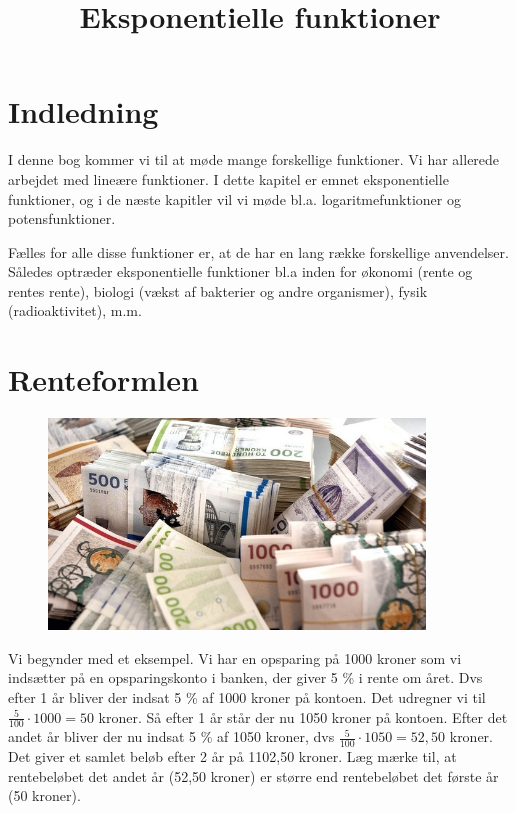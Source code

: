 \documentclass[12pt,oneside,a4paper]{article}
\title{Eksponentielle funktioner}
\begin{document}
\maketitle

\section{Indledning}
I denne bog kommer vi til at møde mange forskellige funktioner. Vi har allerede
arbejdet med lineære funktioner. I dette kapitel er emnet eksponentielle
funktioner, og i de næste kapitler vil vi møde bl.a. logaritmefunktioner og
potensfunktioner.

Fælles for alle disse funktioner er, at de har en lang række forskellige
anvendelser. Således optræder eksponentielle funktioner bl.a inden for økonomi
(rente og rentes rente), biologi (vækst af bakterier og andre organismer),
fysik (radioaktivitet), m.m.

\section{Renteformlen}
\begin{figure}[ht]
    \centering
    \includegraphics[width=10cm]{penge}
\end{figure}

Vi begynder med et eksempel. Vi har en opsparing på 1000 kroner som vi
indsætter på en opsparingskonto i banken, der giver 5 \% i rente om året. Dvs
efter 1 år bliver der indsat 5 \% af 1000 kroner på kontoen. Det
udregner vi til $ \frac{5}{100} \cdot 1000 = 50 $ kroner. Så efter 1 år står
der nu 1050 kroner på kontoen.  Efter det andet år bliver der nu indsat 5 \% af
1050 kroner, dvs $ \frac{5}{100} \cdot 1050 = 52,50$ kroner.
Det giver et samlet beløb efter 2 år på 1102,50 kroner. Læg mærke til, at rentebeløbet
det andet år (52,50 kroner) er større end rentebeløbet det første år (50 kroner).
\end{document}
